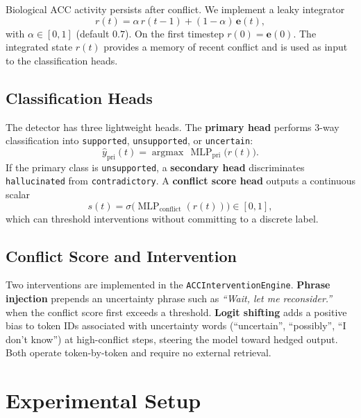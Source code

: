 \documentclass[letterpaper]{article}
\begin{document}
Biological ACC activity persists after conflict. We implement a leaky integrator
\begin{equation}
    r(t) = \alpha \, r(t-1) + (1-\alpha) \, \mathbf{e}(t),
\end{equation}
with $\alpha \in [0,1]$ (default $0.7$). On the first timestep $r(0) = \mathbf{e}(0)$. The integrated state $r(t)$ provides a memory of recent conflict and is used as input to the classification heads.

\subsection{Classification Heads}

The detector has three lightweight heads. The \textbf{primary head} performs 3-way classification into \texttt{supported}, \texttt{unsupported}, or \texttt{uncertain}:
\begin{equation}
    \hat{y}_{\text{pri}}(t) = \operatorname{argmax} \, \operatorname{MLP}_{\text{pri}}\bigl(r(t)\bigr).
\end{equation}
If the primary class is \texttt{unsupported}, a \textbf{secondary head} discriminates \texttt{hallucinated} from \texttt{contradictory}. A \textbf{conflict score head} outputs a continuous scalar
\begin{equation}
    s(t) = \sigma\bigl(\operatorname{MLP}_{\text{conflict}}(r(t))\bigr) \in [0,1],
\end{equation}
which can threshold interventions without committing to a discrete label.

\subsection{Conflict Score and Intervention}

Two interventions are implemented in the \texttt{ACCInterventionEngine}. \textbf{Phrase injection} prepends an uncertainty phrase such as \textit{``Wait, let me reconsider.''} when the conflict score first exceeds a threshold. \textbf{Logit shifting} adds a positive bias to token IDs associated with uncertainty words (``uncertain'', ``possibly'', ``I don't know'') at high-conflict steps, steering the model toward hedged output. Both operate token-by-token and require no external retrieval.

\section{Experimental Setup}
\end{document}
